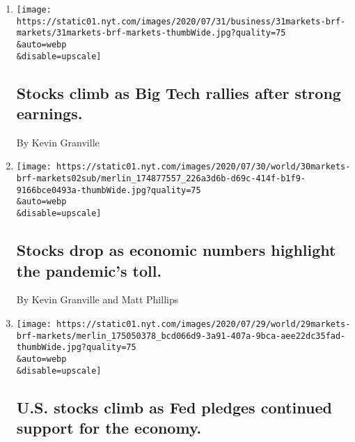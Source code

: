\begin{enumerate}
\def\labelenumi{\arabic{enumi}.}
\item
  \href{/live/2020/07/31/business/stock-market-today-coronavirus/stocks-climb-as-big-tech-rallies-after-strong-earnings}{}

  \texttt{[image: https://static01.nyt.com/images/2020/07/31/business/31markets-brf-markets/31markets-brf-markets-thumbWide.jpg?quality=75\\\&auto=webp\\\&disable=upscale]}

  \hypertarget{stocks-climb-as-big-tech-rallies-after-strong-earnings}{%
  \subsection{Stocks climb as Big Tech rallies after strong
  earnings.}\label{stocks-climb-as-big-tech-rallies-after-strong-earnings}}

  By Kevin Granville
\item
  \href{/live/2020/07/30/business/stock-market-today-coronavirus/stocks-drop-as-economic-numbers-highlight-the-pandemics-toll}{}

  \texttt{[image: https://static01.nyt.com/images/2020/07/30/world/30markets-brf-markets02sub/merlin\_174877557\_226a3d6b-d69c-414f-b1f9-9166bce0493a-thumbWide.jpg?quality=75\\\&auto=webp\\\&disable=upscale]}

  \hypertarget{stocks-drop-as-economic-numbers-highlight-the-pandemics-toll}{%
  \subsection{Stocks drop as economic numbers highlight the pandemic's
  toll.}\label{stocks-drop-as-economic-numbers-highlight-the-pandemics-toll}}

  By Kevin Granville and Matt Phillips
\item
  \href{/live/2020/07/29/business/stock-market-today-coronavirus/us-stocks-climb-as-fed-pledges-continued-support-for-the-economy}{}

  \texttt{[image: https://static01.nyt.com/images/2020/07/29/world/29markets-brf-markets/merlin\_175050378\_bcd066d9-3a91-407a-9bca-aee22dc35fad-thumbWide.jpg?quality=75\\\&auto=webp\\\&disable=upscale]}

  \hypertarget{us-stocks-climb-as-fed-pledges-continued-support-for-the-economy}{%
  \subsection{U.S. stocks climb as Fed pledges continued support for the
  economy.}\label{us-stocks-climb-as-fed-pledges-continued-support-for-the-economy}}


\end{enumerate}
